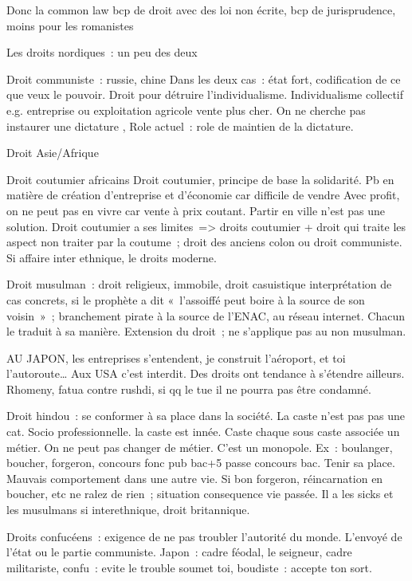 \documentclass[a4paper,12pt]{article}
\begin{document}
Donc la common law bcp de droit avec des loi non écrite, bcp de jurisprudence, moins pour les romanistes

Les droits nordiques :  un peu des deux



Droit communiste : russie, chine
Dans les deux cas : état fort, codification de ce que veux le pouvoir. Droit pour détruire l’individualisme. Individualisme collectif e.g. entreprise ou exploitation agricole vente plus cher. On ne cherche pas instaurer une dictature , Role actuel : role de maintien de la dictature. 





Droit Asie/Afrique

Droit coutumier africains
Droit coutumier, principe de base la solidarité.
Pb en matière de création d’entreprise et d’économie car difficile de vendre
Avec profit, on ne peut pas en vivre car vente à prix coutant. Partir en ville n’est pas une solution.
Droit coutumier a ses limites => droits coutumier + droit qui traite les aspect non traiter par la coutume ; droit des anciens colon ou droit communiste. Si affaire inter ethnique, le droits moderne. 


Droit musulman : droit religieux, immobile, droit casuistique interprétation de cas concrets, si le prophète a dit « l’assoiffé peut boire à la source de son voisin » ; branchement pirate à la source de l’ENAC, au réseau internet. Chacun le traduit à sa manière. Extension du droit ; ne s’applique pas au non musulman. 

AU JAPON, les entreprises s’entendent, je construit l’aéroport, et toi l’autoroute…
Aux USA c’est interdit. 
Des droits ont tendance à s’étendre ailleurs.  Rhomeny, fatua contre rushdi, si qq le tue il ne pourra pas être condamné.


Droit hindou : se conformer à sa place dans la société. La caste n’est pas pas une cat. Socio professionnelle. la caste est innée. Caste chaque sous caste associée un métier. On ne peut pas changer de métier. C’est un monopole. Ex : boulanger, boucher, forgeron, concours fonc pub bac+5 passe concours bac. Tenir sa place. Mauvais comportement dans une autre vie. Si bon forgeron, réincarnation en boucher, etc ne ralez de rien ; situation consequence vie passée. Il  a les sicks et les musulmans si interethnique, droit britannique.


Droits confucéens : exigence de ne pas troubler l’autorité du monde. L’envoyé de l’état ou le partie communiste.
Japon : cadre féodal, le seigneur, cadre militariste, confu : evite le trouble soumet toi, boudiste : accepte ton sort.
\end{document}
